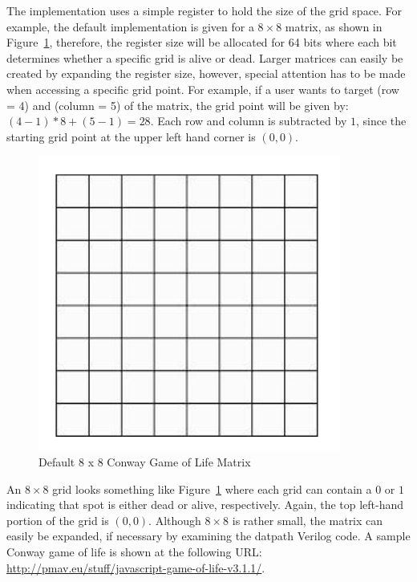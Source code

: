 \documentclass{article}
\begin{document}
The implementation uses a simple register to hold the size of the grid space. For example, the
default implementation is given for a $8 \times 8$ matrix, as shown in
Figure~\ref{conway-grid}, therefore, the register
size will be allocated for 64 bits where each bit determines whether a specific grid is alive or
dead. Larger matrices can easily be created by expanding the register size, however, special
attention has to be made when accessing a specific grid point. For example, if a user wants to
target (row = 4) and (column = 5) of the matrix, the grid point will
be given by: $(4-1)*8 + (5-1) = 28$. Each row and column is subtracted
by $1$, since the starting grid point at the upper left hand
corner is $(0,0)$.
\begin{figure}
  \centering
  \includegraphics[scale=0.4]{grid8x8.png}
  \caption{Default 8 x 8 Conway Game of Life Matrix}
  \label{conway-grid}
\end{figure}

An $8 \times 8$ grid looks something like Figure~\ref{conway-grid}
where each grid can contain a $0$ or $1$ indicating that
spot is either dead or alive, respectively. Again, the top left-hand portion of the grid is $(0,0)$.
Although $8 \times 8$ is rather small, the matrix can easily be expanded, if necessary by examining the
datpath Verilog code. A sample Conway game of life is shown at the
following URL:
\url{http://pmav.eu/stuff/javascript-game-of-life-v3.1.1/}. 
\end{document}
